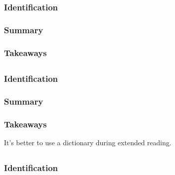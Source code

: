 \documentclass[
	letterpaper, %
]{jdf}
\begin{document}
\subsubsection{Identification}

\subsubsection{Summary}

\subsubsection{Takeaways}

\subsection{}
\subsubsection{Identification}

\subsubsection{Summary}

\subsubsection{Takeaways}
It's better to use a dictionary during extended reading.

\subsection{}
\subsubsection{Identification}
\end{document}
